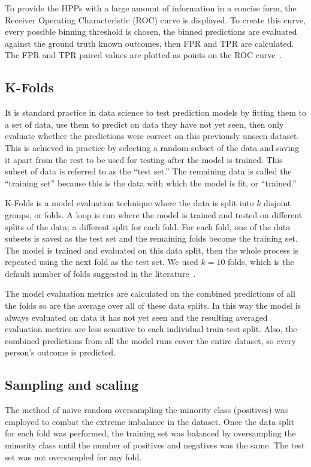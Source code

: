 \documentclass[10pt,letterpaper]{article}
\begin{document}
To provide the HPPs with a large amount of information in a concise form, the Receiver Operating Characteristic (ROC) curve is displayed. To create this curve, every possible binning threshold is chosen, the binned predictions are evaluated against the ground truth known outcomes, then FPR and TPR are calculated. The FPR and TPR paired values are plotted as points on the ROC curve~\cite{fawcett2006introduction}.

\subsection*{K-Folds}
It is standard practice in data science to test prediction models by fitting them to a set of data, use them to predict on data they have not yet seen, then only evaluate whether the predictions were correct on this previously unseen dataset. This is achieved in practice by selecting a random subset of the data and saving it apart from the rest to be used for testing after the model is trained. This subset of data is referred to as the ``test set.'' The remaining data is called the ``training set'' because this is the data with which the model is fit, or ``trained.'' 

K-Folds is a model evaluation technique where the data is split into $k$ disjoint groups, or folds. A loop is run where the model is trained and tested on different splits of the data; a different split for each fold. For each fold, one of the data subsets is saved as the test set and the remaining folds become the training set. The model is trained and evaluated on this data split, then the whole process is repeated using the next fold as the test set. We used $k = 10$ folds, which is the default number of folds suggested in the literature~\cite{marcot2020optimal}.

The model evaluation metrics are calculated on the combined predictions of all the folds so are the average over all of these data splits. In this way the model is always evaluated on data it has not yet seen and the resulting averaged evaluation metrics are less sensitive to each individual train-test split. Also, the combined predictions from all the model runs cover the entire dataset, so every person's outcome is predicted.

\subsection*{Sampling and scaling}
The method of naive random oversampling the minority class (positives) was employed to combat the extreme imbalance in the dataset. Once the data split for each fold was performed, the training set was balanced by oversampling the minority class until the number of positives and negatives was the same. The test set was not oversampled for any fold.
\end{document}
